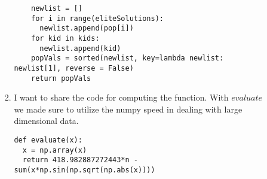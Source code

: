 \documentclass[11pt]{article}
\begin{document}
\begin{enumerate}
\begin{enumerate}
\begin{enumerate}
\begin{verbatim}
    newlist = []
    for i in range(eliteSolutions):
      newlist.append(pop[i])
    for kid in kids:
      newlist.append(kid)
    popVals = sorted(newlist, key=lambda newlist: newlist[1], reverse = False)
    return popVals

\end{verbatim}
\item I want to share the code for computing the function.  With $evaluate$ we made sure to utilize the numpy speed in dealing with large dimensional data.
\begin{verbatim}
def evaluate(x):
  x = np.array(x)
  return 418.982887272443*n -sum(x*np.sin(np.sqrt(np.abs(x))))
\end{verbatim}
\end{enumerate}
\end{enumerate}
\end{enumerate}
\end{document}
